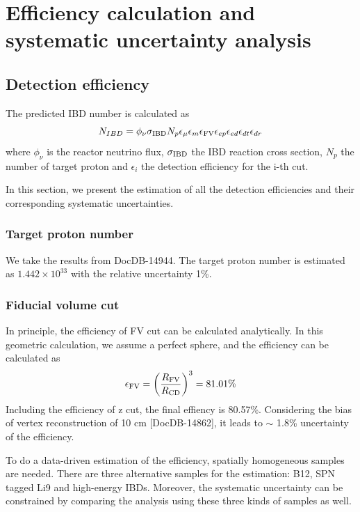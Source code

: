 \section{Efficiency calculation and systematic uncertainty analysis}

\subsection{Detection efficiency}
The predicted IBD number is calculated as
\begin{equation}
    N_{IBD} = \phi_{\nu}\sigma_{\rm IBD}N_{p} \epsilon_{\mu}\epsilon_{m}\epsilon_{\rm FV}\epsilon_{ep}\epsilon_{ed}\epsilon_{dt}\epsilon_{dr}
    \label{eq:pred_ibd_num}
\end{equation}
where $\phi_{\nu}$ is the reactor neutrino flux, $\sigma_{\rm IBD}$ the IBD reaction cross section, $N_{p}$ the number of target proton and $\epsilon_{i}$ the detection efficiency for the i-th cut.

In this section, we present the estimation of all the detection efficiencies and their corresponding systematic uncertainties.


\subsubsection{Target proton number}
We take the results from DocDB-14944.
The target proton number is estimated as $1.442 \times 10^{33}$ with the relative uncertainty 1\%.

\subsubsection{Fiducial volume cut}
In principle, the efficiency of FV cut can be calculated analytically. In this geometric calculation, we assume a perfect sphere, and the efficiency can be calculated as 
\begin{equation}
    \epsilon_{\rm FV} = \left(\frac{R_{\rm FV}}{R_{\rm CD}}\right)^{3} = 81.01\%
    \label{eq:fv_eff}
\end{equation}
Including the efficiency of z cut, the final effiency is 80.57\%.
Considering the bias of vertex reconstruction of 10 cm [DocDB-14862], it leads to $\sim$ 1.8\% uncertainty of the efficiency.

To do a data-driven estimation of the efficiency, spatially homogeneous samples are needed.
There are three alternative samples for the estimation: B12, SPN tagged Li9 and high-energy IBDs.
Moreover, the systematic uncertainty can be constrained by comparing the analysis using these three kinds of samples as well.

